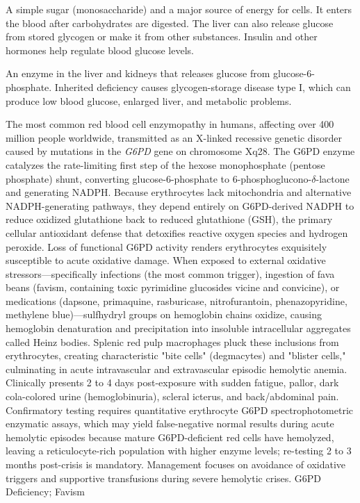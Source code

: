  A simple sugar (monosaccharide) and a major source of energy for cells. It enters the blood after carbohydrates are digested. The liver can also release glucose from stored glycogen or make it from other substances. Insulin and other hormones help regulate blood glucose levels.

 An enzyme in the liver and kidneys that releases glucose from glucose-6-phosphate. Inherited deficiency causes glycogen-storage disease type I, which can produce low blood glucose, enlarged liver, and metabolic problems.

 The most common red blood cell enzymopathy in humans, affecting over 400 million people worldwide, transmitted as an X-linked recessive genetic disorder caused by mutations in the \textit{G6PD} gene on chromosome Xq28. The G6PD enzyme catalyzes the rate-limiting first step of the hexose monophosphate (pentose phosphate) shunt, converting glucose-6-phosphate to 6-phosphoglucono-$\delta$-lactone and generating NADPH. Because erythrocytes lack mitochondria and alternative NADPH-generating pathways, they depend entirely on G6PD-derived NADPH to reduce oxidized glutathione back to reduced glutathione (GSH), the primary cellular antioxidant defense that detoxifies reactive oxygen species and hydrogen peroxide. Loss of functional G6PD activity renders erythrocytes exquisitely susceptible to acute oxidative damage. When exposed to external oxidative stressors—specifically infections (the most common trigger), ingestion of fava beans (favism, containing toxic pyrimidine glucosides vicine and convicine), or medications (dapsone, primaquine, rasburicase, nitrofurantoin, phenazopyridine, methylene blue)—sulfhydryl groups on hemoglobin chains oxidize, causing hemoglobin denaturation and precipitation into insoluble intracellular aggregates called Heinz bodies. Splenic red pulp macrophages pluck these inclusions from erythrocytes, creating characteristic "bite cells" (degmacytes) and "blister cells," culminating in acute intravascular and extravascular episodic hemolytic anemia. Clinically presents 2 to 4 days post-exposure with sudden fatigue, pallor, dark cola-colored urine (hemoglobinuria), scleral icterus, and back/abdominal pain. Confirmatory testing requires quantitative erythrocyte G6PD spectrophotometric enzymatic assays, which may yield false-negative normal results during acute hemolytic episodes because mature G6PD-deficient red cells have hemolyzed, leaving a reticulocyte-rich population with higher enzyme levels; re-testing 2 to 3 months post-crisis is mandatory. Management focuses on avoidance of oxidative triggers and supportive transfusions during severe hemolytic crises.
\synonyms
G6PD Deficiency; Favism

